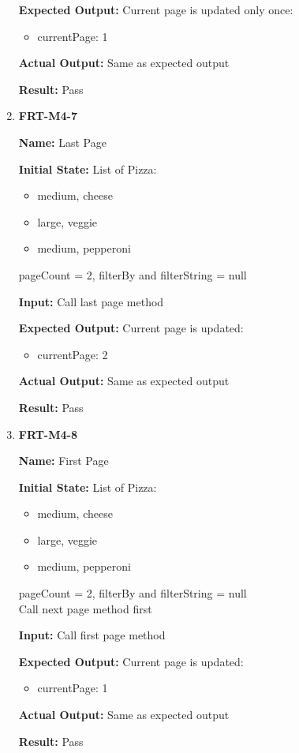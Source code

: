 \documentclass[12pt, titlepage]{article}
\begin{document}
\begin{enumerate}
\textbf{Expected Output:} Current page is updated only once:
\begin{itemize}
\item currentPage: 1
\end{itemize}

\textbf{Actual Output:} Same as expected output

\textbf{Result:} Pass

\item \textbf{FRT-M4-7}

\textbf{Name:} Last Page

\textbf{Initial State:} List of Pizza:
\begin{itemize}
\item medium, cheese
\item large, veggie
\item medium, pepperoni
\end{itemize}
pageCount = 2, filterBy and filterString = null
					
\textbf{Input:} Call last page method
					
\textbf{Expected Output:} Current page is updated:
\begin{itemize}
\item currentPage: 2
\end{itemize}

\textbf{Actual Output:} Same as expected output

\textbf{Result:} Pass

\item \textbf{FRT-M4-8}

\textbf{Name:} First Page

\textbf{Initial State:} List of Pizza:
\begin{itemize}
\item medium, cheese
\item large, veggie
\item medium, pepperoni
\end{itemize}
pageCount = 2, filterBy and filterString = null\\
Call next page method first
					
\textbf{Input:} Call first page method
					
\textbf{Expected Output:} Current page is updated:
\begin{itemize}
\item currentPage: 1
\end{itemize} 

\textbf{Actual Output:} Same as expected output

\textbf{Result:} Pass
\end{enumerate}
\end{document}
